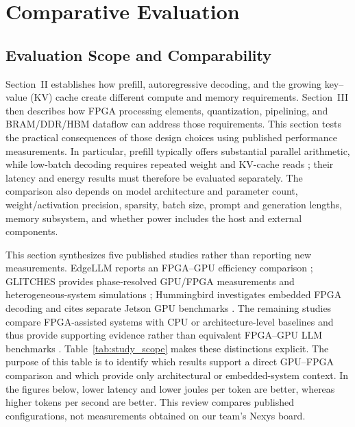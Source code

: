 \section{Comparative Evaluation}\label{sec:comparison}

\subsection{Evaluation Scope and Comparability}
Section~II establishes how prefill, autoregressive decoding, and the growing key--value (KV) cache create different compute and memory requirements. Section~III then describes how FPGA processing elements, quantization, pipelining, and BRAM/DDR/HBM dataflow can address those requirements. This section tests the practical consequences of those design choices using published performance measurements. In particular, prefill typically offers substantial parallel arithmetic, while low-batch decoding requires repeated weight and KV-cache reads \cite{yang2024glitches}; their latency and energy results must therefore be evaluated separately. The comparison also depends on model architecture and parameter count, weight/activation precision, sparsity, batch size, prompt and generation lengths, memory subsystem, and whether power includes the host and external components.

This section synthesizes five published studies rather than reporting new measurements. EdgeLLM reports an FPGA--GPU efficiency comparison \cite{huang2025edgellm}; GLITCHES provides phase-resolved GPU/FPGA measurements and heterogeneous-system simulations \cite{yang2024glitches}; Hummingbird investigates embedded FPGA decoding and cites separate Jetson GPU benchmarks \cite{li2025hummingbird}. The remaining studies compare FPGA-assisted systems with CPU or architecture-level baselines and thus provide supporting evidence rather than equivalent FPGA--GPU LLM benchmarks \cite{chang2025codesign,prieto2024comparative}. Table~\ref{tab:study_scope} makes these distinctions explicit. The purpose of this table is to identify which results support a direct GPU--FPGA comparison and which provide only architectural or embedded-system context. In the figures below, lower latency and lower joules per token are better, whereas higher tokens per second are better. This review compares published configurations, not measurements obtained on our team's Nexys board.

